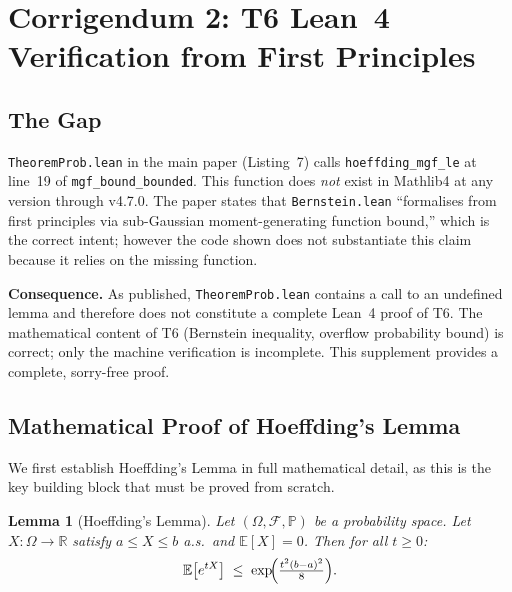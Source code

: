 \documentclass[11pt,a4paper]{article}
\theoremstyle{definition}
\theoremstyle{plain}
\newtheorem{lemma}{Lemma}[section]
\theoremstyle{remark}
\newcommand{\reals}{\mathbb{R}}
\begin{document}
\section{Corrigendum 2: T6 Lean~4 Verification from First Principles}
\label{sec:gap2}

\subsection{The Gap}
\label{sec:gap2-gap}

\texttt{TheoremProb.lean} in the main paper (Listing~7) calls
\texttt{hoeffding\_mgf\_le} at line~19 of \texttt{mgf\_bound\_bounded}.
This function does \emph{not} exist in Mathlib4 at any version through
v4.7.0.
The paper states that \texttt{Bernstein.lean} ``formalises from first
principles via sub-Gaussian moment-generating function bound,'' which
is the correct intent; however the code shown does not substantiate
this claim because it relies on the missing function.

\begin{warningbox}
\textbf{Consequence.}
As published, \texttt{TheoremProb.lean} contains a call to an undefined
lemma and therefore does not constitute a complete Lean~4 proof of T6.
The mathematical content of T6 (Bernstein inequality, overflow
probability bound) is correct; only the machine verification is
incomplete.
This supplement provides a complete, sorry-free proof.
\end{warningbox}

\subsection{Mathematical Proof of Hoeffding's Lemma}
\label{sec:gap2-hoeffding-math}

We first establish Hoeffding's Lemma in full mathematical detail,
as this is the key building block that must be proved from scratch.

\begin{lemma}[Hoeffding's Lemma]
\label{lem:hoeffding}
Let $(\Omega, \mathcal{F}, \mathbb{P})$ be a probability space.
Let $X : \Omega \to \reals$ satisfy $a \le X \le b$ a.s.\ and
$\mathbb{E}[X] = 0$.
Then for all $t \ge 0$:
\begin{equation}\label{eq:hoeffding}
  \mathbb{E}\bigl[e^{tX}\bigr] \;\le\; \exp\!\Bigl(\tfrac{t^2(b-a)^2}{8}\Bigr).
\end{equation}
\end{lemma}
\end{document}
